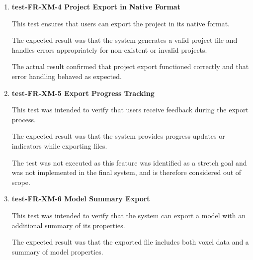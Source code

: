 \documentclass[12pt, titlepage]{article}
\begin{document}
\begin{enumerate}
\item \textbf{test-FR-XM-4 Project Export in Native Format}

\hspace{1.5em} This test ensures that users can export the project in its native format.

The expected result was that the system generates a valid project file and handles errors appropriately for non-existent or invalid projects.

The actual result confirmed that project export functioned correctly and that error handling behaved as expected.


\item \textbf{test-FR-XM-5 Export Progress Tracking}

\hspace{1.5em} This test was intended to verify that users receive feedback during the export process.

The expected result was that the system provides progress updates or indicators while exporting files.

The test was not executed as this feature was identified as a stretch goal and was not implemented in the final system, and is therefore considered out of scope.


\item \textbf{test-FR-XM-6 Model Summary Export}

\hspace{1.5em} This test was intended to verify that the system can export a model with an additional summary of its properties.

The expected result was that the exported file includes both voxel data and a summary of model properties.


\end{enumerate}
\end{document}
